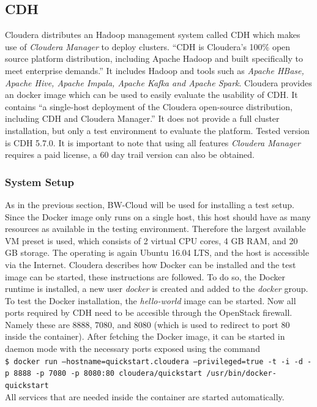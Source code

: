 \subsection{\acl{CDH}}

Cloudera distributes an Hadoop management system called \ac{CDH} which makes use of \emph{Cloudera Manager} to deploy clusters.
\enquote{CDH is Cloudera’s 100\% open source platform distribution, including Apache Hadoop and built specifically to meet enterprise demands.}\autocite[][]{cloudera2018cdh}
It includes Hadoop and tools such as \emph{Apache HBase, Apache Hive, Apache Impala, Apache Kafka and Apache Spark}.
Cloudera provides an docker image which can be used to easily evaluate the usability of \ac{CDH}.
It contains \enquote{a single-host deployment of the Cloudera open-source distribution, including CDH and Cloudera Manager.} \autocite[][]{cloudera2018docker}
It does not provide a full cluster installation, but only a test environment to evaluate the platform.
Tested version is \ac{CDH} 5.7.0.
It is important to note that using all features \emph{Cloudera Manager} requires a paid license, a 60 day trail version can also be obtained. \autocite[][p.~30]{wi2018managementsystems}

\subsubsection{System Setup}

As in the previous section, BW-Cloud will be used for installing a test setup.
Since the Docker image only runs on a single host, this host should have as many resources as available in the testing environment.
Therefore the largest available \ac{VM} preset is used, which consists of 2 virtual \ac{CPU} cores, 
4 \ac{GB} \ac{RAM}, and 20 \ac{GB} storage. The operating is again Ubuntu 16.04 \ac{LTS}, 
and the host is accessible via the Internet. 
Cloudera describes how Docker can be installed and the test image can be started, 
these instructions are followed. \autocite[][]{cloudera2018docker}
To do so, the Docker runtime is installed, a new  user \emph{docker} is created and added to the \emph{docker} group. To test the Docker installation, the \emph{hello-world} image can be started.
Now all ports required by \ac{CDH} need to be accesible through the OpenStack firewall.
Namely these are 8888, 7080, and 8080 (which is used to redirect to port 80 inside the container).
After fetching the Docker  image, it can be started in daemon mode with the necessary ports exposed using the command\\
\texttt{\$ docker run --hostname=quickstart.cloudera --privileged=true -t -i -d -p 8888 -p 7080 -p 8080:80 cloudera/quickstart /usr/bin/docker-quickstart}\\
All services that are needed inside the container are started automatically.


